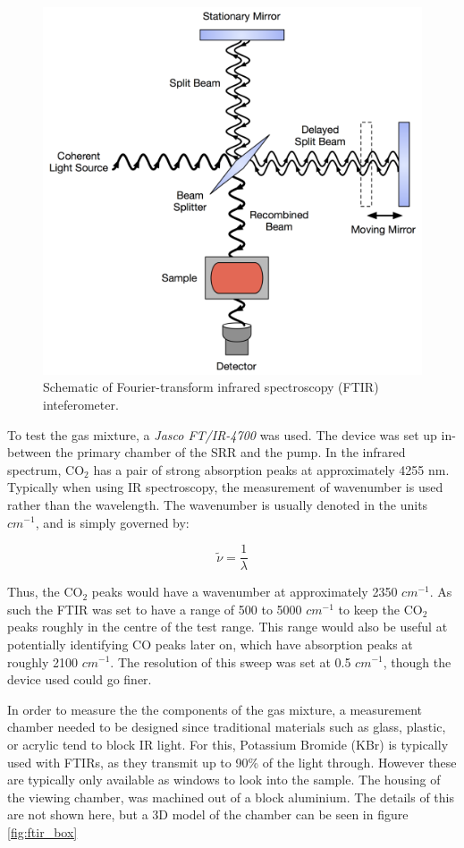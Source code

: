 \begin{figure}[h!]
	\centering
	\includegraphics[width=0.6\linewidth]{chapter_4/figures/FTIR_Interferometer.png}
	\caption{Schematic of Fourier-transform infrared spectroscopy (FTIR) inteferometer.}
	\label{fig:ftir_inteferometer}
\end{figure}

To test the gas mixture, a \textit{Jasco FT/IR-4700} was used. The device was set up in-between the primary chamber of the SRR and the pump. In the infrared spectrum, CO$_2$ has a pair of strong absorption peaks at approximately 4255 nm. Typically when using IR spectroscopy, the measurement of wavenumber is used rather than the wavelength. The wavenumber is usually denoted in the units $cm^{-1}$, and is simply governed by:

\begin{equation}
    \tilde{\nu} = \frac{1}{\lambda}
\end{equation}

Thus, the CO$_2$ peaks would have a wavenumber at approximately 2350 $cm^{-1}$. As such the FTIR was set to have a range of 500 to 5000 $cm^{-1}$ to keep the CO$_2$ peaks roughly in the centre of the test range. This range would also be useful at potentially identifying CO peaks later on, which have absorption peaks at roughly 2100 $cm^{-1}$. The resolution of this sweep was set at 0.5 $cm^{-1}$, though the device used could go finer. 

In order to measure the the components of the gas mixture, a measurement chamber needed to be designed since traditional materials such as glass, plastic, or acrylic tend to block IR light. For this, Potassium Bromide (KBr) is typically used with FTIRs, as they transmit up to 90\% of the light through. However these are typically only available as windows to look into the sample. The housing of the viewing chamber, was machined out of a block aluminium. The details of this are not shown here, but a 3D model of the chamber can be seen in figure \ref{fig:ftir_box}

